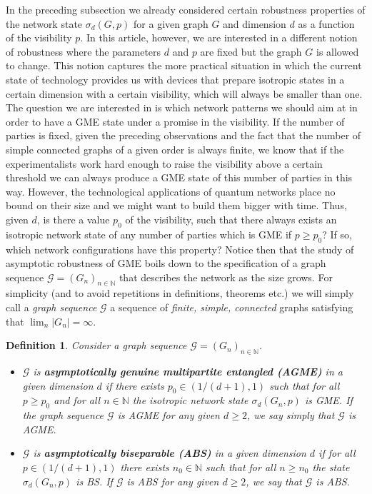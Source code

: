 \documentclass[a4paper,onecolumn,accepted=2024-12-14]{quantumarticle}
\theoremstyle{plain}
\newtheorem{definition}[theorem]{Definition}%
\newcommand{\cG}{{\mathcal G}}         %
\newcommand{\N}{\mathbb{N}} %
\begin{document}
In the preceding subsection we already considered certain robustness properties of the network state $\sigma_d(G,p)$ for a given graph $G$ and dimension $d$
as a function of the visibility $p$. In this article, however, we are interested in a different notion of robustness where the parameters $d$ and $p$ are fixed but the graph $G$ is allowed to change.
This notion captures the more practical situation in which the current state of technology provides us with devices that prepare isotropic states in a certain dimension with a certain visibility, which will always be smaller than one. The question we are interested in is which network patterns we should aim at in order to have a GME state under a promise in the visibility. If the number of parties is fixed, given the preceding observations and the fact that the number of simple connected graphs of a given order is always finite, we know that if the experimentalists work hard enough to raise the visibility above a certain threshold we can always produce a GME state of this number of parties in this way. However, the technological applications of quantum networks place no bound on their size and we might want to build them bigger with time. Thus, given $d$, is there a value  $p_{0}$ of the visibility, such that there always exists an isotropic network state of any number of parties which is GME if $p\geq p_{0}$? If so, which network configurations have this property? Notice then that the study of asymptotic robustness of GME boils down to the specification of a graph sequence $\cG=(G_n)_{n\in\N}$ that describes the network as the size grows. For simplicity (and to avoid repetitions in definitions, theorems etc.) we will simply call a \textit{graph sequence} $\cG$ a sequence of \textit{finite, simple, connected} graphs satisfying that $\lim_n|G_n|=\infty$.


\begin{definition}\label{def:asymptotic}
 Consider a graph sequence $\cG=(G_n)_{n\in\N}$.
\begin{itemize}
 \item[(i)]%
 $\cG$ is \textbf{asymptotically genuine multipartite entangled (AGME)} in a given dimension $d$ if there exists $p_0\in(1/(d+1),1)$ such that for all $p\geq p_0$ and for all $n\in\N$ the isotropic network state $\sigma_d(G_n,p)$ is GME. If the graph sequence $\cG$ is AGME for any given $d\geq2$, we say simply that $\cG$ is AGME.

 \item[(ii)]%
$\cG$ is \textbf{asymptotically biseparable (ABS)} in a given dimension $d$ if for all $p\in(1/(d+1),1)$ there exists $n_0\in\mathbb{N}$ such that for all $n\geq n_0$ the state $\sigma_d(G_n,p)$ is BS. If $\cG$ is ABS for any given $d\geq2$, we say that $\cG$ is ABS.
\end{itemize}
\end{definition}
\end{document}
